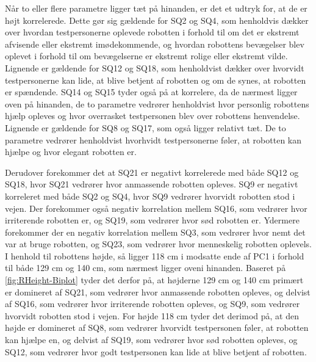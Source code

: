 \noindent
%
Når to eller flere parametre ligger tæt på hinanden, er det et udtryk for, at de er højt korrelerede. Dette gør sig gældende for SQ2 og SQ4, som henholdvis dækker over hvordan testpersonerne oplevede robotten i forhold til om det er ekstremt afvisende eller ekstremt imødekommende, og hvordan robottens bevægelser blev oplevet i forhold til om bevægelserne er ekstremt rolige eller ekstremt vilde. Lignende er gældende for SQ12 og SQ18, som henholdvist dækker over hvorvidt testpersonerne kan lide, at blive betjent af robotten og om de synes, at robotten er spændende. SQ14 og SQ15 tyder også på at korrelere, da de nærmest ligger oven på hinanden, de to parametre vedrører henholdvist hvor personlig robottens hjælp opleves og hvor overrasket testpersonen blev over robottens henvendelse. Lignende er gældende for SQ8 og SQ17, som også ligger relativt tæt. De to parametre vedrører henholdvist hvorhvidt testpersonerne føler, at robotten kan hjælpe og hvor elegant robotten er. 

Derudover forekommer det at SQ21 er negativt korrelerede med både SQ12 og SQ18, hvor SQ21 vedrører hvor anmassende robotten opleves. SQ9 er negativt korreleret med både SQ2 og SQ4, hvor SQ9 vedrører hvorvidt robotten stod i vejen. Der forekommer også negativ korrelation mellem SQ16, som vedrører hvor irriterende robotten er, og SQ19, som vedrører hvor sød robotten er. Ydermere forekommer der en negativ korrelation mellem SQ3, som vedrører hvor nemt det var at bruge robotten, og SQ23, som vedrører hvor menneskelig robotten oplevels.\blankline
%
I henhold til robottens højde, så ligger 118 cm i modsatte ende af PC1 i forhold til både 129 cm og 140 cm, som nærmest ligger oveni hinanden. Baseret på \autoref{fig:RHeight-Biplot} tyder det derfor på, at højderne 129 cm og 140 cm primært er domineret af SQ21, som vedrører hvor anmassende robotten opleves, og delvist af SQ16, som vedrører hvor irriterende robotten opleves, og SQ9, som vedrører hvorvidt robotten stod i vejen. For højde 118 cm tyder det derimod på, at den højde er domineret af SQ8, som vedrører hvorvidt testpersonen føler, at robotten kan hjælpe en, og delvist af SQ19, som vedrører hvor sød robotten opleves, og SQ12, som vedrører hvor godt testpersonen kan lide at blive betjent af robotten. 

